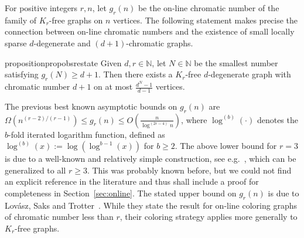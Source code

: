 \documentclass[10pt]{amsart}
\theoremstyle{definition}
\begin{document}

For positive integers $r,n$, let $g_r(n)$ be the on-line chromatic number of the family of $K_r$-free graphs on $n$ vertices. The following statement makes precise the connection between on-line chromatic numbers and the existence of small locally sparse $d$-degenerate and $(d+1)$-chromatic graphs.

\begin{restatable}{proposition}{propobsrestate} \label{prop:obs}
    Given $d,r\in \mathbb{N}$, let $N\in \mathbb{N}$ be the smallest number satisfying $g_r(N)\ge d+1$. Then there exists a $K_r$-free $d$-degenerate graph with chromatic number $d+1$ on at most $\frac{d^{N}-1}{d-1}$ vertices.  
\end{restatable}

The previous best known asymptotic bounds on $g_r(n)$ are $\Omega(n^{(r-2)/(r-1)})\le g_r(n)\le O\left(\frac{n}{\log^{(2r-4)} n}\right)$, where $\log^{(b)}(\cdot)$ denotes the $b$-fold iterated logarithm function, defined as $\log^{(b)}(x):=\log(\log^{b-1}(x))$ for $b\ge 2$. The above lower bound for $r=3$ is due to a well-known and relatively simple construction, see e.g.~\cite{dvorakkawab,gutow,kierstead}, which can be generalized to all $r\ge 3$. This was probably known before, but we could not find an explicit reference in the literature and thus shall include a proof for completeness in Section~\ref{sec:online}. The stated upper bound on $g_r(n)$ is due to Lov\'{a}sz, Saks and Trotter~\cite{lovasz}. While they state the result for on-line coloring graphs of chromatic number less than $r$, their coloring strategy applies more generally to $K_r$-free graphs.
\end{document}
